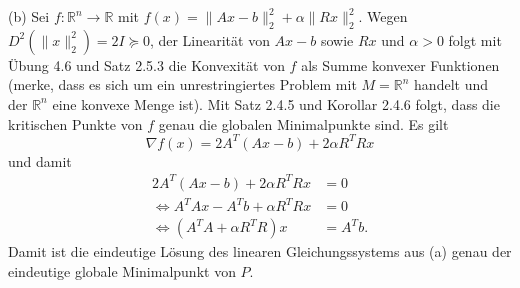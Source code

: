 \documentclass[ngerman, a4paper,12pt]{article}
\begin{document}
\par
(b) Sei $f: \mathbb{R}^n \rightarrow \mathbb{R}$ mit $f(x) = \|Ax-b \|_2^2 + \alpha \|Rx \|_2^2$. Wegen $D^2( \|x \|_2^2)=2I \succeq 0$, der Linearität von $Ax-b$ sowie $Rx$ und $\alpha > 0$ folgt mit Übung 4.6 und Satz 2.5.3 die Konvexität von $f$ als Summe konvexer Funktionen (merke, dass es sich um ein unrestringiertes Problem mit $M=\mathbb{R}^n$ handelt und der $\mathbb{R}^n$ eine konvexe Menge ist). Mit Satz 2.4.5 und Korollar 2.4.6 folgt, dass die kritischen Punkte von $f$ genau die globalen Minimalpunkte sind. Es gilt
\begin{equation}
	\nabla f(x) = 2A^T(Ax-b) + 2\alpha R^TRx
\end{equation}
und damit
\begin{equation*}
	\begin{split}
		2A^T(Ax-b) + 2\alpha R^TRx &= 0 \\
		\Leftrightarrow A^TAx-A^Tb+\alpha R^TRx &=0 \\
		\Leftrightarrow (A^TA+\alpha R^TR)x &=A^Tb.
	\end{split}
\end{equation*}
Damit ist die eindeutige Lösung des linearen Gleichungssystems aus (a) genau der eindeutige globale Minimalpunkt von $P$.
\end{document}
